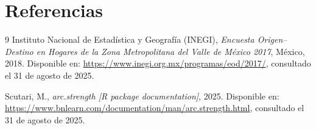 \documentclass[twocolumn]{article}
\begin{document}
\section{Referencias}
\begin{thebibliography}{9}
\setlength{\itemsep}{0pt}
\setlength{\parskip}{0pt}
Instituto Nacional de Estadística y Geografía (INEGI),
\textit{Encuesta Origen–Destino en Hogares de la Zona Metropolitana del Valle de México 2017},
México, 2018.
Disponible en: \url{https://www.inegi.org.mx/programas/eod/2017/}, consultado el 31 de agosto de 2025.

Scutari, M.,
\textit{arc.strength [R package documentation]},
2025.
Disponible en: \url{https://www.bnlearn.com/documentation/man/arc.strength.html}, consultado el 31 de agosto de 2025.

\end{thebibliography}
\end{document}
